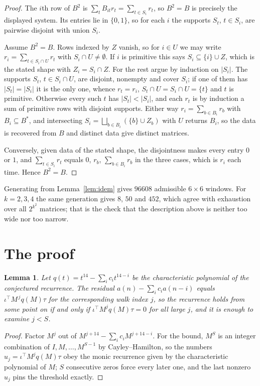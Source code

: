 \documentclass[11pt,a4paper]{article}
\theoremstyle{plain}
\newtheorem{lemma}[theorem]{Lemma}
\theoremstyle{definition}
\begin{document}
\begin{proof}
The $i$th row of $B^2$ is $\sum_t B_{it}r_t=\sum_{t\in S_i}r_t$, so $B^2=B$ is precisely the
displayed system. Its entries lie in $\{0,1\}$, so for each $i$ the supports $S_t$,
$t\in S_i$, are pairwise disjoint with union $S_i$.

Assume $B^2=B$. Rows indexed by $Z$ vanish, so for $i\in U$ we may write
$r_i=\sum_{t\in S_i\cap U}r_t$ with $S_i\cap U\neq\emptyset$. If $i$ is primitive this says
$S_i\subseteq\{i\}\cup Z$, which is the stated shape with $Z_i=S_i\cap Z$. For the rest argue
by induction on $|S_i|$. The supports $S_t$, $t\in S_i\cap U$, are disjoint, nonempty and
cover $S_i$; if one of them has $|S_t|=|S_i|$ it is the only one, whence $r_t=r_i$,
$S_t\cap U=S_i\cap U=\{t\}$ and $t$ is primitive. Otherwise every such $t$ has
$|S_t|<|S_i|$, and each $r_t$ is by induction a sum of primitive rows with disjoint supports.
Either way $r_i=\sum_{b\in B_i}r_b$ with $B_i\subseteq B^{\ast}$, and intersecting
$S_i=\bigsqcup_{b\in B_i}(\{b\}\cup Z_b)$ with $U$ returns $B_i$, so the data is recovered
from $B$ and distinct data give distinct matrices.

Conversely, given data of the stated shape, the disjointness makes every entry $0$ or $1$, and
$\sum_{t\in S_i}r_t$ equals $0$, $r_b$, $\sum_{b\in B_i}r_b$ in the three cases, which is
$r_i$ each time. Hence $B^2=B$.
\end{proof}

Generating from Lemma~\ref{lem:idem} gives $96608$ admissible $6\times6$ windows. For
$k=2,3,4$ the same generation gives $8$, $50$ and $452$, which agree with exhaustion over all
$2^{k^2}$ matrices; that is the check that the description above is neither too wide nor too
narrow.

\section{The proof}

\begin{lemma}\label{lem:crit}
Let $q(t)=t^{14}-\sum_i c_it^{14-i}$ be the characteristic polynomial of the
conjectured recurrence. The residual $a(n)-\sum_ic_ia(n-i)$ equals
$\iota^{\!\top}M^{\,j}q(M)\tau$ for the corresponding walk index $j$, so the recurrence
holds from some point on if and only if $\iota^{\!\top}M^{j}q(M)\tau=0$ for all large $j$,
and it is enough to examine $j<S$.
\end{lemma}

\begin{proof}
Factor $M^{j}$ out of $M^{j+14}-\sum_ic_iM^{j+14-i}$. For the bound, $M^{S}$
is an integer combination of $I,M,\dots,M^{S-1}$ by Cayley--Hamilton, so the numbers
$u_j=\iota^{\!\top}M^{j}q(M)\tau$ obey the monic recurrence given by the characteristic
polynomial of $M$; $S$ consecutive zeros force every later one, and the last nonzero $u_j$
pins the threshold exactly.
\end{proof}
\end{document}
